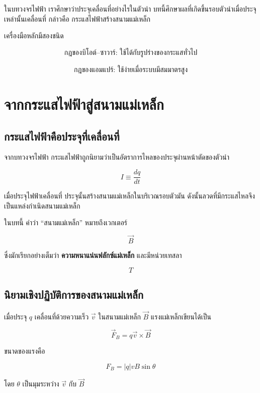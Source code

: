 \begin{tcolorbox}[title={แนวคิดสำคัญของบทนี้}]
ในบทวงจรไฟฟ้า เราศึกษาว่าประจุเคลื่อนที่อย่างไรในตัวนำ บทนี้ศึกษาผลที่เกิดขึ้นรอบตัวนำเมื่อประจุเหล่านั้นเคลื่อนที่ กล่าวคือ กระแสไฟฟ้าสร้างสนามแม่เหล็ก

เครื่องมือหลักมีสองชนิด

\[
\text{กฎของบิโอต์--ซาวาร์: ใช้ได้กับรูปร่างของกระแสทั่วไป}
\]

\[
\text{กฎของแอมแปร์: ใช้ง่ายเมื่อระบบมีสมมาตรสูง}
\]
\end{tcolorbox}

\section{จากกระแสไฟฟ้าสู่สนามแม่เหล็ก}

\subsection{กระแสไฟฟ้าคือประจุที่เคลื่อนที่}

จากบทวงจรไฟฟ้า กระแสไฟฟ้าถูกนิยามว่าเป็นอัตราการไหลของประจุผ่านหน้าตัดของตัวนำ

\begin{tcolorbox}[title={นิยาม: กระแสไฟฟ้า}]
\[
\boxed{I\equiv\frac{dq}{dt}}
\]
\end{tcolorbox}

เมื่อประจุไฟฟ้าเคลื่อนที่ ประจุนั้นสร้างสนามแม่เหล็กในบริเวณรอบตัวมัน ดังนั้นลวดที่มีกระแสไหลจึงเป็นแหล่งกำเนิดสนามแม่เหล็ก

ในบทนี้ คำว่า ``สนามแม่เหล็ก'' หมายถึงเวกเตอร์

\[
\vec{B}
\]

ซึ่งมักเรียกอย่างเต็มว่า \textbf{ความหนาแน่นฟลักซ์แม่เหล็ก} และมีหน่วยเทสลา

\[
\si{T}
\]

\subsection{นิยามเชิงปฏิบัติการของสนามแม่เหล็ก}

เมื่อประจุ $q$ เคลื่อนที่ด้วยความเร็ว $\vec{v}$ ในสนามแม่เหล็ก $\vec{B}$ แรงแม่เหล็กเขียนได้เป็น

\begin{tcolorbox}[title={กฎแรงแม่เหล็กและนิยามเชิงปฏิบัติการของ $\vec{B}$}]
\[
\boxed{\vec{F}_B=q\vec{v}\times\vec{B}}
\]

ขนาดของแรงคือ

\[
\boxed{F_B=|q|vB\sin\theta}
\]

โดย $\theta$ เป็นมุมระหว่าง $\vec{v}$ กับ $\vec{B}$
\end{tcolorbox}

